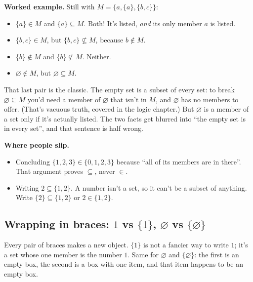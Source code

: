 \textbf{Worked example.} Still with $M=\{a,\{a\},\{b,c\}\}$:
\begin{itemize}
  \item $\{a\}\in M$ and $\{a\}\subseteq M$. Both! It's listed, \emph{and} its only member $a$ is listed.
  \item $\{b,c\}\in M$, but $\{b,c\}\not\subseteq M$, because $b\notin M$.
  \item $\{b\}\notin M$ and $\{b\}\not\subseteq M$. Neither.
  \item $\varnothing\notin M$, but $\varnothing\subseteq M$.
\end{itemize}

That last pair is the classic. The empty set is a subset of every set: to break $\varnothing\subseteq M$ you'd need a member of $\varnothing$ that isn't in $M$, and $\varnothing$ has no members to offer. (That's vacuous truth, covered in the logic chapter.) But $\varnothing$ is a member of a set only if it's actually listed. The two facts get blurred into ``the empty set is in every set'', and that sentence is half wrong.

\textbf{Where people slip.}
\begin{itemize}
  \item Concluding $\{1,2,3\}\in\{0,1,2,3\}$ because ``all of its members are in there''. That argument proves $\subseteq$, never $\in$.
  \item Writing $2\subseteq\{1,2\}$. A number isn't a set, so it can't be a subset of anything. Write $\{2\}\subseteq\{1,2\}$ or $2\in\{1,2\}$.
\end{itemize}

\subsection{\texorpdfstring{Wrapping in braces: $1$ vs $\{1\}$, $\varnothing$ vs $\{\varnothing\}$}{Wrapping in braces}}

Every pair of braces makes a new object. $\{1\}$ is not a fancier way to write $1$; it's a set whose one member is the number $1$. Same for $\varnothing$ and $\{\varnothing\}$: the first is an empty box, the second is a box with one item, and that item happens to be an empty box.

